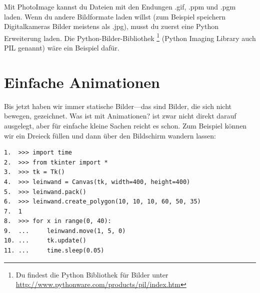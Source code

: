 Mit PhotoImage kannst du Dateien mit den Endungen .gif, .ppm und .pgm laden. Wenn du andere Bildformate laden willst (zum Beispiel speichern Digitalkameras Bilder meistens als .jpg), musst du zuerst eine Python Erweiterung laden. Die Python-Bilder-Bibliothek \footnote{Du findest die Python Bibliothek für Bilder unter \href{http://www.pythonware.com/products/pil/index.htm}{http://www.pythonware.com/products/pil/index.htm}} (Python Imaging Library auch PIL genannt) wäre ein Beispiel dafür.


\section{Einfache Animationen}

Bis jetzt haben wir immer statische Bilder---das sind Bilder, die sich nicht bewegen, gezeichnet. Was ist mit Animationen?  ist zwar nicht direkt darauf ausgelegt, aber für einfache kleine Sachen reicht es schon. Zum Beispiel können wir ein Dreieck füllen und dann über den Bildschirm wandern lassen:

\begin{Verbatim}[frame=single]
1.  >>> import time
2.  >>> from tkinter import *
3.  >>> tk = Tk()
4.  >>> leinwand = Canvas(tk, width=400, height=400)
5.  >>> leinwand.pack()
6.  >>> leinwand.create_polygon(10, 10, 10, 60, 50, 35)
7.  1
8.  >>> for x in range(0, 40):
9.  ...     leinwand.move(1, 5, 0)
10. ...     tk.update()
11. ...     time.sleep(0.05)
\end{Verbatim}

